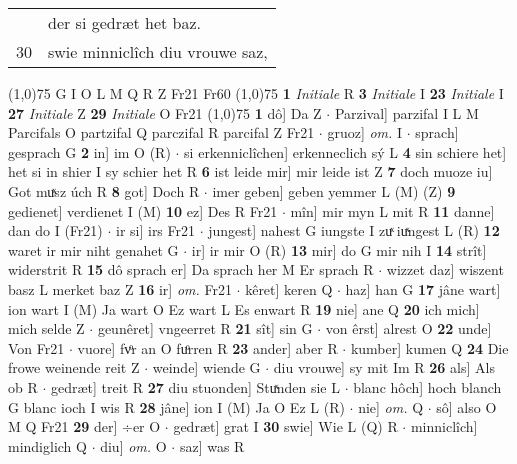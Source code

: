 \documentclass[8pt,a4paper,notitlepage]{article}
\begin{document}
\begin{table}[ht]
\begin{minipage}[t]{0.5\linewidth}
\begin{tabular}{rl}
 & der si gedræt het baz.\\ 
30 & swie minniclîch diu vrouwe saz,\\ 
\end{tabular}
\scriptsize
\line(1,0){75} \newline
G I O L M Q R Z Fr21 Fr60 \newline
\line(1,0){75} \newline
\textbf{1} \textit{Initiale} R  \textbf{3} \textit{Initiale} I  \textbf{23} \textit{Initiale} I  \textbf{27} \textit{Initiale} Z  \textbf{29} \textit{Initiale} O Fr21  \newline
\line(1,0){75} \newline
\textbf{1} dô] Da Z  $\cdot$ Parzival] parzifal I L M Parcifals O partzifal Q parczifal R parcifal Z Fr21  $\cdot$ gruoz] \textit{om.} I  $\cdot$ sprach] gesprach G \textbf{2} in] im O (R)  $\cdot$ si erkenniclîchen] erkenneclich sý L \textbf{4} sin schiere het] het si in shier I sy schier het R \textbf{6} ist leide mir] mir leide ist Z \textbf{7} doch muoze iu] Got muͯsz úch R \textbf{8} got] Doch R  $\cdot$ imer geben] geben yemmer L (M) (Z) \textbf{9} gedienet] verdienet I (M) \textbf{10} ez] Des R Fr21  $\cdot$ mîn] mir myn L mit R \textbf{11} danne] dan do I (Fr21)  $\cdot$ ir si] irs Fr21  $\cdot$ jungest] nahest G iungste I zuͯ iuͯngest L (R) \textbf{12} waret ir mir niht genahet G  $\cdot$ ir] ir mir O (R) \textbf{13} mir] do G mir nih I \textbf{14} strît] widerstrit R \textbf{15} dô sprach er] Da sprach her M Er sprach R  $\cdot$ wizzet daz] wiszent basz L merket baz Z \textbf{16} ir] \textit{om.} Fr21  $\cdot$ kêret] keren Q  $\cdot$ haz] han G \textbf{17} jâne wart] ion wart I (M) Ja wart O Ez wart L Es enwart R \textbf{19} nie] ane Q \textbf{20} ich mich] mich selde Z  $\cdot$ geunêret] vngeerret R \textbf{21} sît] sin G  $\cdot$ von êrst] alrest O \textbf{22} unde] Von Fr21  $\cdot$ vuore] fvͦr an O fuͦrren R \textbf{23} ander] aber R  $\cdot$ kumber] kumen Q \textbf{24} Die frowe weinende reit Z  $\cdot$ weinde] wiende G  $\cdot$ diu vrouwe] sy mit Im R \textbf{26} als] Als ob R  $\cdot$ gedræt] treit R \textbf{27} diu stuonden] Stuͯnden sie L  $\cdot$ blanc hôch] hoch blanch G blanc ioch I wis R \textbf{28} jâne] ion I (M) Ja O Ez L (R)  $\cdot$ nie] \textit{om.} Q  $\cdot$ sô] also O M Q Fr21 \textbf{29} der] ÷er O  $\cdot$ gedræt] grat I \textbf{30} swie] Wie L (Q) R  $\cdot$ minniclîch] mindiglich Q  $\cdot$ diu] \textit{om.} O  $\cdot$ saz] was R \newline
\end{minipage}
\hspace{0.5cm}

\end{table}
\end{document}
